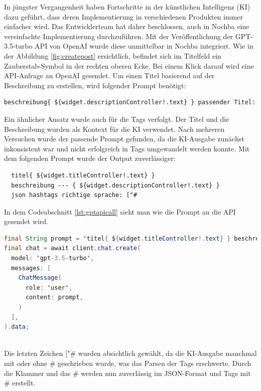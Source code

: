 In jüngster Vergangenheit haben Fortschritte in der künstlichen Intelligenz (KI) dazu geführt, dass deren Implementierung in verschiedenen Produkten immer einfacher wird. Das Entwicklerteam hat daher beschlossen, auch in Nochba eine vereinfachte Implementierung durchzuführen. Mit der Veröffentlichung der GPT-3.5-turbo API von OpenAI wurde diese unmittelbar in Nochba integriert. Wie in der Abbildung \ref{fig:createpost} ersichtlich, befindet sich im Titelfeld ein Zauberstab-Symbol in der rechten oberen Ecke. Bei einem Klick darauf wird eine API-Anfrage an OpenAI gesendet. Um einen Titel basierend auf der Beschreibung zu erstellen, wird folgender Prompt benötigt:
\begin{verbatim}
beschreibung{ ${widget.descriptionController!.text} } passender Titel:
\end{verbatim}



Ein ähnlicher Ansatz wurde auch für die Tags verfolgt. Der Titel und die Beschreibung wurden als Kontext für die KI verwendet. Nach mehreren Versuchen wurde der passende Prompt gefunden, da die KI-Ausgabe zunächst inkonsistent war und nicht erfolgreich in Tags umgewandelt werden konnte. Mit dem folgenden Prompt wurde der Output zuverlässiger:

\begin{verbatim}
  titel{ ${widget.titleController!.text} }
  beschreibung --- { ${widget.descriptionController!.text} }
  json hashtags richtige sprache: ["#
  \end{verbatim}


In dem Codeabschnitt \ref{lst:gptapicall} sieht man wie die Prompt an die API gesendet wird.
\begin{lstlisting}[language=Java,caption=OpenAI GPT-3.5-turbo API Call,label=lst:gptapicall]  
final String prompt = 'titel{ ${widget.titleController!.text} } beschreibung{ ${widget.descriptionController!.text} } json hashtags richtige sprache: ["#';
final chat = await client.chat.create(
  model: 'gpt-3.5-turbo',
  messages: [
    ChatMessage(
      role: 'user',
      content: prompt,
    )
  ],
).data;
      
\end{lstlisting}



Die letzten Zeichen ["\# wurden absichtlich gewählt, da die
KI-Ausgabe manchmal mit oder ohne \# geschrieben wurde, was
das Parsen der Tags erschwerte. Durch die Klammer und das \#
werden nun zuverlässig im JSON-Format und Tags mit \#
erstellt.


